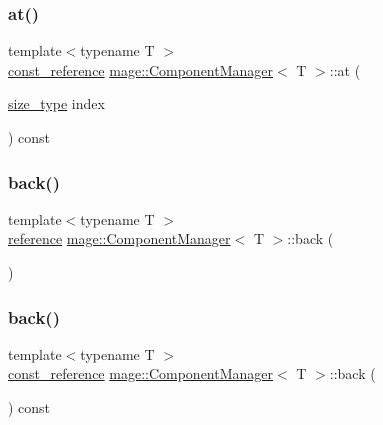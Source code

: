 \subsubsection{\texorpdfstring{at()}{at()}\hspace{0.1cm}{\footnotesize\ttfamily [2/2]}}
{\footnotesize\ttfamily template$<$typename T $>$ \\
\mbox{\hyperlink{classmage_1_1_component_manager_ae1b1c864f0dc2cd35c63e1084971b89c}{const\+\_\+reference}} \mbox{\hyperlink{classmage_1_1_component_manager}{mage\+::\+Component\+Manager}}$<$ T $>$\+::at (\begin{DoxyParamCaption}\item[{\mbox{\hyperlink{classmage_1_1_component_manager_a6bd219525db9ec9f3adb9259e52674da}{size\+\_\+type}}}]{index }\end{DoxyParamCaption}) const}

\mbox{\label{classmage_1_1_component_manager_a17bdea8d1d738f8f5da239592bef69e6}} 
\subsubsection{\texorpdfstring{back()}{back()}\hspace{0.1cm}{\footnotesize\ttfamily [1/2]}}
{\footnotesize\ttfamily template$<$typename T $>$ \\
\mbox{\hyperlink{classmage_1_1_component_manager_a4daeb292f527534c155e359faf7eaf80}{reference}} \mbox{\hyperlink{classmage_1_1_component_manager}{mage\+::\+Component\+Manager}}$<$ T $>$\+::back (\begin{DoxyParamCaption}{ }\end{DoxyParamCaption})\hspace{0.3cm}{\ttfamily [noexcept]}}

\mbox{\label{classmage_1_1_component_manager_a807f7e0c4c72e44e8e1474d543010a7f}} 
\subsubsection{\texorpdfstring{back()}{back()}\hspace{0.1cm}{\footnotesize\ttfamily [2/2]}}
{\footnotesize\ttfamily template$<$typename T $>$ \\
\mbox{\hyperlink{classmage_1_1_component_manager_ae1b1c864f0dc2cd35c63e1084971b89c}{const\+\_\+reference}} \mbox{\hyperlink{classmage_1_1_component_manager}{mage\+::\+Component\+Manager}}$<$ T $>$\+::back (\begin{DoxyParamCaption}{ }\end{DoxyParamCaption}) const\hspace{0.3cm}{\ttfamily [noexcept]}}

